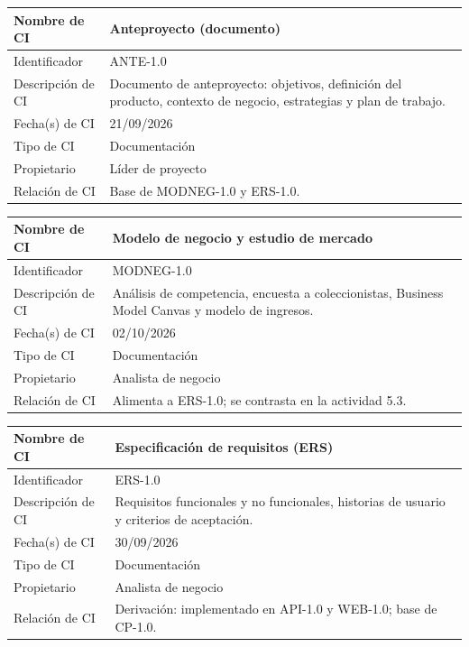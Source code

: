 \documentclass[letterpaper,11pt]{article}
\begin{document}
\bigskip
\noindent\begin{minipage}{\textwidth}
\small\renewcommand{\arraystretch}{1.9}
\begin{tabularx}{\textwidth}{|p{3.3cm}|Y|}
\hline
Nombre de CI & Anteproyecto (documento) \\ \hline
Identificador & ANTE-1.0 \\ \hline
Descripción de CI & Documento de anteproyecto: objetivos, definición del producto, contexto de negocio, estrategias y plan de trabajo. \\ \hline
Fecha(s) de CI & 21/09/2026 \\ \hline
Tipo de CI & Documentación \\ \hline
Propietario & Líder de proyecto \\ \hline
Relación de CI & Base de MODNEG-1.0 y ERS-1.0. \\ \hline
\end{tabularx}
\end{minipage}\par\bigskip
\noindent\begin{minipage}{\textwidth}
\small\renewcommand{\arraystretch}{1.9}
\begin{tabularx}{\textwidth}{|p{3.3cm}|Y|}
\hline
Nombre de CI & Modelo de negocio y estudio de mercado \\ \hline
Identificador & MODNEG-1.0 \\ \hline
Descripción de CI & Análisis de competencia, encuesta a coleccionistas, Business Model Canvas y modelo de ingresos. \\ \hline
Fecha(s) de CI & 02/10/2026 \\ \hline
Tipo de CI & Documentación \\ \hline
Propietario & Analista de negocio \\ \hline
Relación de CI & Alimenta a ERS-1.0; se contrasta en la actividad 5.3. \\ \hline
\end{tabularx}
\end{minipage}\par\bigskip
\noindent\begin{minipage}{\textwidth}
\small\renewcommand{\arraystretch}{1.9}
\begin{tabularx}{\textwidth}{|p{3.3cm}|Y|}
\hline
Nombre de CI & Especificación de requisitos (ERS) \\ \hline
Identificador & ERS-1.0 \\ \hline
Descripción de CI & Requisitos funcionales y no funcionales, historias de usuario y criterios de aceptación. \\ \hline
Fecha(s) de CI & 30/09/2026 \\ \hline
Tipo de CI & Documentación \\ \hline
Propietario & Analista de negocio \\ \hline
Relación de CI & Derivación: implementado en API-1.0 y WEB-1.0; base de CP-1.0. \\ \hline
\end{tabularx}
\end{minipage}\par\bigskip
\end{document}
